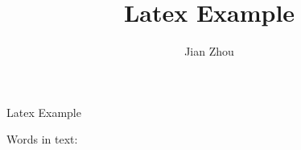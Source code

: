 \documentclass{article}
\title{Latex Example}
\author{Jian Zhou}
\begin{document}
\maketitle



Latex Example~\cite{latex-example}

Words in text: \wordcount



\end{document}
